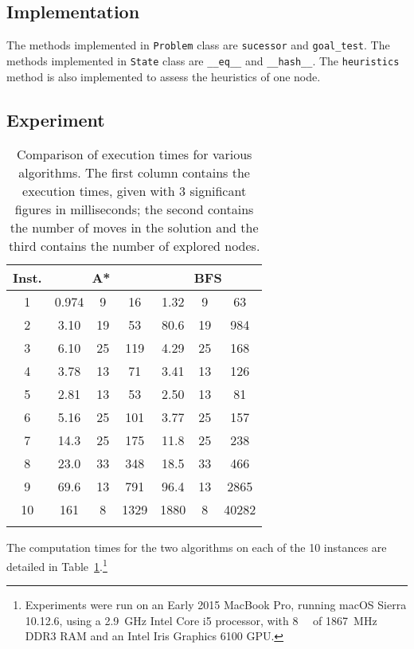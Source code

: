 \documentclass[journal]{IEEEtran}
\newcommand{\py}[1]{\texttt{#1}}
\begin{document}
\subsection{Implementation}
The methods implemented in \py{Problem} class are \py{sucessor} and \py{goal_test}. The methods implemented in \py{State} class are \py{__eq__} and \py{__hash__}. The \py{heuristics} method is also implemented to assess the heuristics of one node.

\subsection{Experiment}
\begin{table}[!hbtp]
	\centering
	\begin{tabular}{c@{\hspace{0.7cm}}ccc|ccc} 
		\toprule
		Inst. & \multicolumn{3}{c}{A*} & \multicolumn{3}{c}{BFS} \\
		\midrule
		1 & 0.974 & 9 & 16  & 1.32 & 9 & 63 \\
		2 & 3.10 & 19 & 53 & 80.6 & 19 & 984 \\
		3 & 6.10 & 25 & 119 & 4.29 & 25 & 168 \\
		4 & 3.78 & 13 & 71 & 3.41 & 13 & 126 \\
		5 & 2.81 & 13 & 53 & 2.50 & 13 & 81 \\
		6 & 5.16 & 25 & 101 & 3.77 & 25 & 157 \\
		7 & 14.3 & 25 & 175 & 11.8 & 25 & 238 \\
		8 & 23.0 & 33 & 348 & 18.5 & 33 & 466 \\
		9 & 69.6 & 13 & 791  & 96.4 & 13 & 2865 \\
		10 & 161 & 8 & 1329 & 1880 & 8 & 40282 \\
		\bottomrule \\
	\end{tabular}
	\caption{Comparison of execution times for various algorithms.
		The first column contains the execution times, given with 3 significant figures in milliseconds; the second contains the number of moves in the solution and the third contains the number of explored nodes.}
	\label{time1}
\end{table}

 The computation times for the two algorithms on each of the 10 instances are detailed in Table~\ref{time1}.\footnote{Experiments were run on an Early 2015 MacBook Pro, running macOS Sierra 10.12.6, using a \SI{2.9}{\giga\hertz} Intel Core i5 processor, with \SI{8}{\giga\byte} of \SI{1867}{\mega\hertz} DDR3 RAM and an Intel Iris Graphics 6100 GPU.} 
\end{document}
